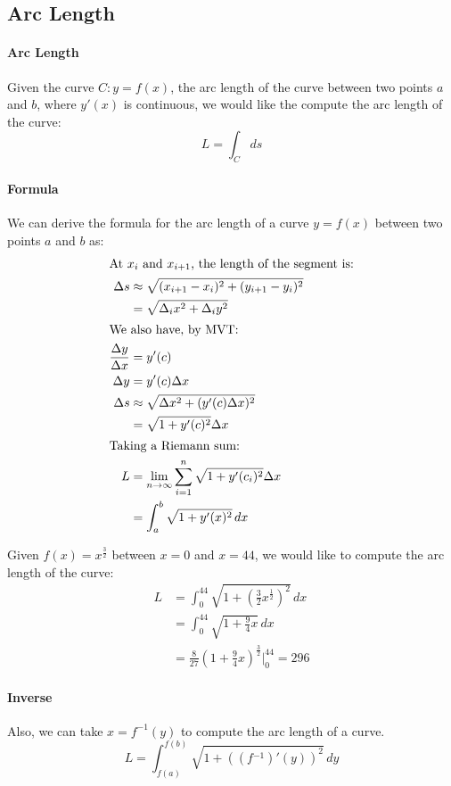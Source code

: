 \documentclass[11pt]{report}
\begin{document}
\subsection{Arc Length}
\paragraph{Arc Length}
    Given the curve $C: y = f(x)$, the arc length of the curve between two points $a$ and $b$, where $y'(x)$ is continuous, we would like the compute the arc length of the curve:
    $$ L = \int_C ds$$
\paragraph{Formula} We can derive the formula for the arc length of a curve $y = f(x)$ between two points $a$ and $b$ as:
\begin{align}
    \intertext{At $x_i$ and $x_{i+1}$, the length of the segment is:}
    \Delta s &\approx \sqrt{(x_{i+1} - x_i)^2 + (y_{i+1} - y_i)^2} \nonumber \\
            &= \sqrt{\Delta_i x^2 + \Delta_i y^2} \nonumber \\
    \intertext{We also have, by MVT:}
    \frac{\Delta y}{\Delta x} &= y'(c) \nonumber \\
    \Delta y &= y'(c) \Delta x \nonumber \\
    \Delta s &\approx \sqrt{\Delta x^2 + (y'(c) \Delta x)^2} \nonumber \\
            &= \sqrt{1 + y'(c)^2} \Delta x \nonumber \\
    \intertext{Taking a Riemann sum:}
    L &= \lim_{n \to \infty} \sum_{i=1}^n \sqrt{1 + y'(c_i)^2} \Delta x \nonumber \\
    &= \int_a^b \sqrt{1 + y'(x)^2} \, dx 
\end{align}
\begin{example}
    Given $f(x) = x^\frac{3}{2}$ between $x = 0$ and $x = 44$, we would like to compute the arc length of the curve:
    \begin{align*}
        L &= \int_0^{44} \sqrt{1 + \left(\frac{3}{2}x^{\frac{1}{2}}\right)^2} \, dx \\
        &= \int_0^{44} \sqrt{1 + \frac{9}{4}x} \, dx \\
        &= \frac{8}{27} \left(1 + \frac{9}{4}x\right)^{\frac{3}{2}} \Big|_0^{44} = 296
    \end{align*}
\end{example}
\paragraph{Inverse} Also, we can take $x = f^{-1}(y)$ to compute the arc length of a curve.
\begin{equation}
    L = \int_{f(a)}^{f(b)} \sqrt{1 + ((f{^{-1}})'(y))^2} \, dy
\end{equation}
\end{document}
